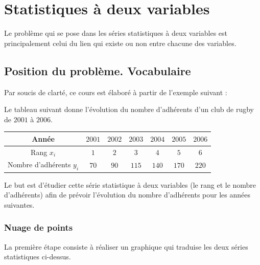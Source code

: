 \documentclass[french]{book}
\begin{document}
\tableofcontents










\chapter{Statistiques à deux variables}
Le problème qui se pose dans les séries statistiques à deux variables est principalement celui du lien qui existe ou non entre chacune des variables. 
\section{Position du problème. Vocabulaire}

Par soucis de clarté, ce cours est élaboré à partir de l'exemple suivant :



\begin{exemple}
Le tableau suivant donne l'évolution du nombre d'adhérents d'un club de rugby de $2001$ à $2006$.
\begin{center}
   \begin{tabular}{|c|*{6}{C{1}|}}
      \hline
      Année & $2001$ & $2002$ & $2003$ & $2004$ & $2005$ & $2006$ \\
      \hline
      Rang $x_{i}$ & $1$ & $2$ & $3$ & $4$ & $5$ & $6$ \\
      \hline
      Nombre d'adhérents $y_{i}$ & $70$ & $90$ & $115$ & $140$ & $170$ & $220$ \\
      \hline
   \end{tabular}
\end{center}
Le but est d'étudier cette série statistique à deux variables (le rang et le nombre d'adhérents) afin de prévoir l'évolution du nombre d'adhérents pour les années suivantes.
\end{exemple}

\subsection{Nuage de points}

La première étape consiste à réaliser un graphique qui traduise les deux séries statistiques ci-dessus.
\end{document}
